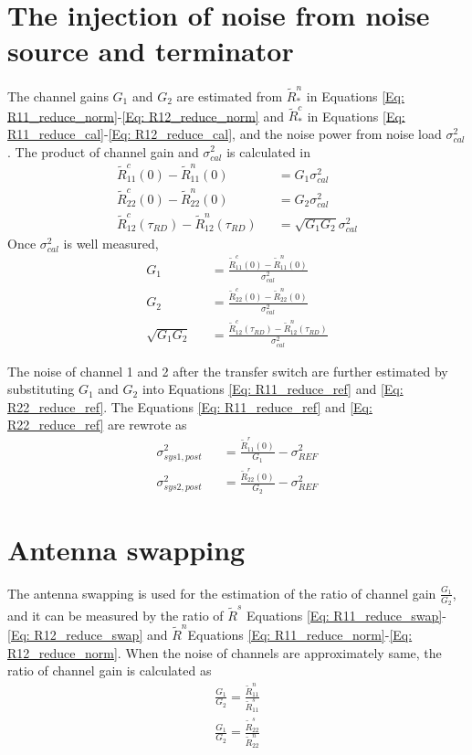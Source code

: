 \documentclass[draftcls,onecolumn]{IEEEtran}  %
\begin{document}
\section{The injection of noise from noise source and terminator}
The channel gains $G_1$ and $G_2$ are estimated from  $\tilde{R}^n_*$ in Equations \ref{Eq: R11_reduce_norm}-\ref{Eq: R12_reduce_norm} and $\tilde{R}^c_*$ in Equations \ref{Eq: R11_reduce_cal}-\ref{Eq: R12_reduce_cal}, and the noise power from noise load $\sigma^2_{cal}$. The product of channel gain and $\sigma^2_{cal}$ is calculated in
\begin{eqnarray}
	\tilde{R}^c_{11}(0) - \tilde{R}^n_{11}(0)&&= G_1\sigma^2_{cal} \label{Eq: Cal_channel_gain1a} \\
    \tilde{R}^c_{22}(0) - \tilde{R}^n_{22}(0)&&= G_2\sigma^2_{cal} \label{Eq: Cal_channel_gain2a} \\
    \tilde{R}^c_{12}(\tau_{RD}) - \tilde{R}^n_{12}(\tau_{RD})&&= \sqrt{G_1 G_2}\sigma^2_{cal} \label{Eq: Cal_channel_gain12a}
\end{eqnarray}
Once $\sigma^2_{cal}$ is well measured, 
\begin{eqnarray}
	G_1 &&= \frac{\tilde{R}^c_{11}(0) - \tilde{R}^n_{11}(0)}{\sigma^2_{cal}}  \label{Eq: Cal_channel_gain1} \\
    G_2 &&= \frac{\tilde{R}^c_{22}(0) - \tilde{R}^n_{22}(0)}{\sigma^2_{cal}}  \label{Eq: Cal_channel_gain2} \\
    \sqrt{G_1 G_2} &&= \frac{\tilde{R}^c_{12}(\tau_{RD}) - \tilde{R}^n_{12}(\tau_{RD})}{\sigma^2_{cal}}  \label{Eq: Cal_channel_gain12}
\end{eqnarray}

The noise of channel 1 and 2 after the transfer switch are further estimated by substituting $G_1$ and $G_2$ into Equations \ref{Eq: R11_reduce_ref} and \ref{Eq: R22_reduce_ref}. The Equations \ref{Eq: R11_reduce_ref} and \ref{Eq: R22_reduce_ref} are rewrote as
\begin{eqnarray}
	\sigma^2_{sys1,post} &&= \frac{\tilde{R}^r_{11}(0) }{G_1}-\sigma^2_{REF}  \label{Eq: Cal_channel_noise1} \\
    \sigma^2_{sys2,post} &&= \frac{\tilde{R}^r_{22}(0) }{G_2}-\sigma^2_{REF}  \label{Eq: Cal_channel_noise2} 
\end{eqnarray}
\section{Antenna swapping}
The antenna swapping \cite{Alejandro:2013} is used for the estimation of the ratio of channel gain $\frac{G_1}{G_2}$, and it can be measured by the ratio of $\tilde{R}^s$ Equations \ref{Eq: R11_reduce_swap}-\ref{Eq: R12_reduce_swap} and $\tilde{R}^n$Equations \ref{Eq: R11_reduce_norm}-\ref{Eq: R12_reduce_norm}. When the noise of channels are approximately same, the ratio of channel gain is calculated as
\begin{eqnarray}
	\frac{G_1}{G_2} = \frac{\tilde{R}^n_{11}}{\tilde{R}^s_{11}} \\
    \frac{G_1}{G_2} = \frac{\tilde{R}^s_{22}}{\tilde{R}^n_{22}}  \label{Eq: Cal_channel_gain_ratio}
\end{eqnarray}
\end{document}
